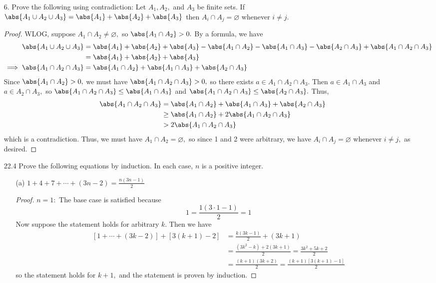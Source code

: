 \documentclass{article}
\begin{document}
\begin{itemize}
	\item[6.] Prove the following using contradiction: Let $A_1, A_2,$ and $A_3$ be finite sets. If $\abs{A_1\cup A_2\cup A_3}=\abs{A_1}+\abs{A_2}+\abs{A_3}$ then $A_i\cap A_j=\varnothing$ whenever $i\neq j.$
		\begin{proof}
			WLOG, suppose $A_1\cap A_2\neq\varnothing,$ so $\abs{A_1\cap A_2}>0.$ By a formula, we have
			\begin{align*}
				\abs{A_1\cup A_2\cup A_3} &= \abs{A_1}+\abs{A_2}+\abs{A_3}-\abs{A_1\cap A_2}-\abs{A_1\cap A_3}-\abs{A_2\cap A_3}+\abs{A_1\cap A_2\cap A_3} \\
				&= \abs{A_1}+\abs{A_2}+\abs{A_3} \\
				\implies \abs{A_1\cap A_2\cap A_3} &= \abs{A_1\cap A_2}+\abs{A_1\cap A_3}+\abs{A_2\cap A_3}
			\end{align*}
			Since $\abs{A_1\cap A_2}>0,$ we must have $\abs{A_1\cap A_2\cap A_3}>0,$ so there exists $a\in A_1\cap A_2\cap A_3.$ Then $a\in A_1\cap A_3$ and $a\in A_2\cap A_3,$ so $\abs{A_1\cap A_2\cap A_3}\le \abs{A_1\cap A_3}$ and $\abs{A_1\cap A_2\cap A_3}\le \abs{A_2\cap A_3}.$ Thus,
			\begin{align*}
				\abs{A_1\cap A_2\cap A_3} &= \abs{A_1\cap A_2}+\abs{A_1\cap A_3}+\abs{A_2\cap A_3} \\
				&\ge \abs{A_1\cap A_2} + 2\abs{A_1\cap A_2\cap A_3} \\
				&> 2\abs{A_1\cap A_2\cap A_3}
			\end{align*}
			which is a contradiction. Thus, we must have $A_1\cap A_2=\varnothing,$ so since 1 and 2 were arbitrary, we have $A_i\cap A_j=\varnothing$ whenever $i\neq j,$ as desired.
		\end{proof}

	\item[22.4] Prove the following equations by induction. In each case, $n$ is a positive integer.
		\begin{itemize}
			\item[(a)] $1+4+7+\cdots+(3n-2)=\frac{n(3n-1)}{2}$
				\begin{proof}
					$n=1:$ The base case is satisfied because
					\[1=\frac{1(3\cdot 1-1)}{2} = 1\]
					Now suppose the statement holds for arbitrary $k.$ Then we have
					\begin{align*}
						\left[1+\cdots+(3k-2)\right] + \left[ 3(k+1)-2 \right] &= \frac{k(3k-1)}{2} + (3k+1) \\
						&= \frac{(3k^2-k)+2(3k+1)}{2} = \frac{3k^2+5k+2}{2} \\
						&= \frac{(k+1)(3k+2)}{2} = \frac{(k+1)\left[ 3(k+1)-1 \right]}{2}
					\end{align*}
					so the statement holds for $k+1,$ and the statement is proven by induction.
				\end{proof}


\end{itemize}
\end{itemize}
\end{document}
